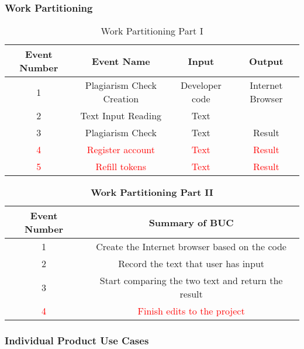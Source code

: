 \documentclass[12pt, titlepage]{article}
\begin{document}
\subsubsection{Work Partitioning}
\begin{table}[H]
\caption{Work Partitioning Part I}
\begin{center}
\begin{tabular}{|c|c|c|c|}
\hline
Event Number & Event Name & Input & Output\\
\hline
1 & Plagiarism Check Creation & Developer code & Internet Browser\\
\hline
2 & Text Input Reading & Text & \\
\hline
3 & Plagiarism Check  & Text & Result\\
\hline
\textcolor{red}{4} & \textcolor{red}{Register account}  & \textcolor{red}{Text} & \textcolor{red}{Result}\\
\hline
\textcolor{red}{5} & \textcolor{red}{Refill tokens}  & \textcolor{red}{Text} & \textcolor{red}{Result}\\
\hline
\end{tabular}
\end{center}
\label{default}
\end{table}%

\begin{table}[H]
\caption{\bf Work Partitioning Part II}
\begin{center}
\begin{tabular}{|c|c|}

\hline
Event Number & Summary of BUC\\
\hline
1 & Create the Internet browser based on the code\\ 
\hline
2 & Record the text that user has input\\
\hline
3 & Start comparing the two text and return the result\\
\hline
\textcolor{red}{4} & \textcolor{red}{Finish edits to the project}\\
\hline

\end{tabular}
\end{center}
\label{default}
\end{table}%



\subsubsection{Individual Product Use Cases}
\end{document}
